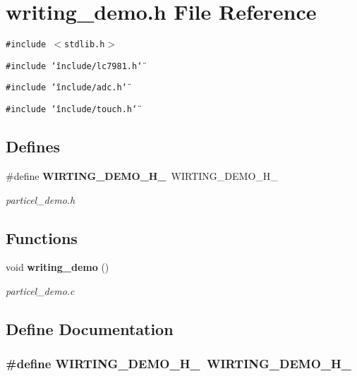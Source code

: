 \section{writing\_\-demo.h File Reference}
\label{writing__demo_8h}
{\tt \#include $<$stdlib.h$>$}\par
{\tt \#include \char`\"{}include/lc7981.h\char`\"{}}\par
{\tt \#include \char`\"{}include/adc.h\char`\"{}}\par
{\tt \#include \char`\"{}include/touch.h\char`\"{}}\par
\subsection*{Defines}
\begin{CompactItemize}
\item 
\#define {\bf WIRTING\_\-DEMO\_\-H\_\-}~WIRTING\_\-DEMO\_\-H\_\-
\begin{CompactList}\small\item\em particel\_\-demo.h \item\end{CompactList}\end{CompactItemize}
\subsection*{Functions}
\begin{CompactItemize}
\item 
void {\bf writing\_\-demo} ()
\begin{CompactList}\small\item\em particel\_\-demo.c \item\end{CompactList}\end{CompactItemize}


\subsection{Define Documentation}
\subsubsection{\setlength{\rightskip}{0pt plus 5cm}\#define WIRTING\_\-DEMO\_\-H\_\-~WIRTING\_\-DEMO\_\-H\_\-}\label{writing__demo_8h_69a65c026c8b8e97c7b6f99de76ab00d}


